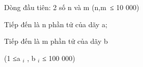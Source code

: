 Dòng đầu tiên: 2 số n và m (n,m ≤ 10 000)

Tiếp đến là n phần tử của dãy a;

Tiếp đến là m phần tử của dãy b

(1 ≤a $_ i $ , b $_ i $ ≤ 100 000)

\